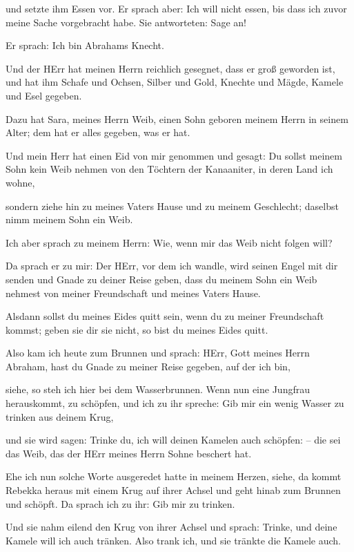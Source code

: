 und setzte ihm Essen vor. Er sprach aber: Ich will nicht
essen, bis dass ich zuvor meine Sache vorgebracht habe. Sie antworteten:
Sage an!

 Er sprach: Ich bin Abrahams Knecht.

 Und der HErr hat meinen Herrn reichlich gesegnet, dass er
groß geworden ist, und hat ihm Schafe und Ochsen, Silber und Gold,
Knechte und Mägde, Kamele und Esel gegeben.

 Dazu hat Sara, meines Herrn Weib, einen Sohn geboren
meinem Herrn in seinem Alter; dem hat er alles gegeben, was er hat.

 Und mein Herr hat einen Eid von mir genommen und gesagt:
Du sollst meinem Sohn kein Weib nehmen von den Töchtern der Kanaaniter,
in deren Land ich wohne,

 sondern ziehe hin zu meines Vaters Hause und zu meinem
Geschlecht; daselbst nimm meinem Sohn ein Weib.

 Ich aber sprach zu meinem Herrn: Wie, wenn mir das Weib
nicht folgen will?

 Da sprach er zu mir: Der HErr, vor dem ich wandle, wird
seinen Engel mit dir senden und Gnade zu deiner Reise geben, dass du
meinem Sohn ein Weib nehmest von meiner Freundschaft und meines Vaters
Hause.

 Alsdann sollst du meines Eides quitt sein, wenn du zu
meiner Freundschaft kommst; geben sie dir sie nicht, so bist du meines
Eides quitt.

 Also kam ich heute zum Brunnen und sprach: HErr, Gott
meines Herrn Abraham, hast du Gnade zu meiner Reise gegeben, auf der ich
bin,

 siehe, so steh ich hier bei dem Wasserbrunnen. Wenn nun
eine Jungfrau herauskommt, zu schöpfen, und ich zu ihr spreche: Gib mir
ein wenig Wasser zu trinken aus deinem Krug,

 und sie wird sagen: Trinke du, ich will deinen Kamelen
auch schöpfen: -- die sei das Weib, das der HErr meines Herrn Sohne
beschert hat.

 Ehe ich nun solche Worte ausgeredet hatte in meinem
Herzen, siehe, da kommt Rebekka heraus mit einem Krug auf ihrer Achsel
und geht hinab zum Brunnen und schöpft. Da sprach ich zu ihr: Gib mir zu
trinken.

 Und sie nahm eilend den Krug von ihrer Achsel und sprach:
Trinke, und deine Kamele will ich auch tränken. Also trank ich, und sie
tränkte die Kamele auch.

